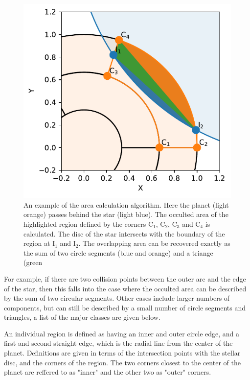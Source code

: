 \documentclass[a4paper,fleqn,usenatbib]{mnras}
\begin{document}
\begin{figure}
	\begin{center}
		\includegraphics[width=\columnwidth]{img/diagram.pdf}
		\caption{An example of the area calculation algorithm. Here the planet (light orange) passes behind the star (light blue). The occulted area of the highlighted region defined by the corners C$_1$,  C$_2$, C$_3$ and C$_4$ is calculated. The disc of the star intersects with the boundary of the region at I$_1$ and I$_2$. The overlapping area can be recovered exactly as the sum of two circle segments (blue and orange) and a triange (green}
		\label{fig:collision}
	\end{center}
\end{figure}

For example, if there are two collision points between the outer arc and the edge of the star, then this falls into the case where the occulted area can be described by the sum of two circular segments. Other cases include larger numbers of components, but can still be described by a small number of circle segments and triangles, a list of the major classes are given below.

An individual region is defined as having an inner and outer circle edge, and a first and second straight edge, which is the radial line from the center of the planet. Definitions are given in terms of the intersection points with the stellar disc, and the corners of the region. The two corners closest to the center of the planet are reffered to as "inner" and the other two as "outer" corners.
\end{document}
